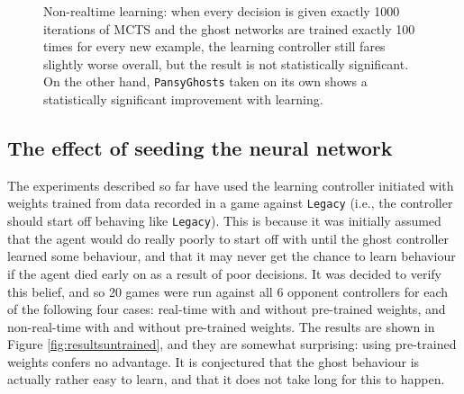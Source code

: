 \begin{figure}
\centering
{}
\caption[Non-realtime learning]{Non-realtime learning: when every decision is given exactly 1000 iterations of MCTS and the ghost networks are trained exactly 100 times for every new example, the learning controller still fares slightly worse overall, but the result is not statistically significant.  On the other hand, {\tt PansyGhosts} taken on its own shows a statistically significant improvement with learning.}
\label{fig:resultsrealtime}
\end{figure}


\subsection{The effect of seeding the neural network}

The experiments described so far have used the learning controller initiated with weights trained from data recorded in a game against {\tt Legacy} (i.e., the controller should start off behaving like {\tt Legacy}).  This is because it was initially assumed that the agent would do really poorly to start off with until the ghost controller learned some behaviour, and that it may never get the chance to learn behaviour if the agent died early on as a result of poor decisions.  It was decided to verify this belief, and so 20 games were run against all 6 opponent controllers for each of the following four cases: real-time with and without pre-trained weights, and non-real-time with and without pre-trained weights.  The results are shown in Figure \ref{fig:resultsuntrained}, and they are somewhat surprising: using pre-trained weights confers no advantage.  It is conjectured that the ghost behaviour is actually rather easy to learn, and that it does not take long for this to happen.

